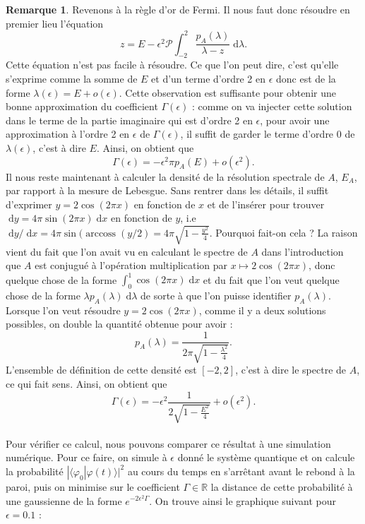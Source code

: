 \documentclass[12pt,openany,a4paper, titlepage]{article}
\newcommand{\f}[2]{\frac{#1}{#2}}
\newcommand{\dd}{\;\mathrm{d}}
\newcommand{\R}{\mathbb{R}}
\newcommand{\vp}{\varphi}
\theoremstyle{definition}
\theoremstyle{definition}
\theoremstyle{definition}
\theoremstyle{definition}
\theoremstyle{definition}
\newtheorem{rem}{Remarque}
\theoremstyle{definition}
\begin{document}
\begin{rem}
Revenons à la règle d'or de Fermi. Il nous faut donc résoudre en premier lieu l'équation
\begin{equation}
    z = E - \epsilon^2 \mathcal{P} \int_{-2}^2\f{p_A(\lambda)}{\lambda - z} \dd{\lambda}.
\end{equation}
Cette équation n'est pas facile à résoudre. Ce que l'on peut dire, c'est qu'elle s'exprime comme la somme de $E$ et d'un terme d'ordre 2 en $\epsilon$ donc est de la forme $\lambda(\epsilon) = E + o(\epsilon)$. Cette observation est suffisante pour obtenir une bonne approximation du coefficient $\Gamma(\epsilon)$ : comme on va injecter cette solution dans le terme de la partie imaginaire qui est d'ordre 2 en $\epsilon$, pour avoir une approximation à l'ordre 2 en $\epsilon$ de $\Gamma(\epsilon)$, il suffit de garder le terme d'ordre $0$ de $\lambda(\epsilon)$, c'est à dire $E$. Ainsi, on obtient que 
\begin{equation}
    \Gamma(\epsilon) = -\epsilon^2 \pi p_A(E) + o(\epsilon^2).
\end{equation}
Il nous reste maintenant à calculer la densité de la résolution spectrale de $A$, $E_A$, par rapport à la mesure de Lebesgue. Sans rentrer dans les détails, il suffit d'exprimer $y=2\cos(2\pi x)$ en fonction de $x$ et de l'insérer pour trouver $\dd y = 4\pi\sin(2\pi x) \dd x$ en fonction de $y$, i.e $\dd y / \dd x = 4\pi\sin(\operatorname{arccoss}( y/2)  = 4\pi \sqrt{1-\f{y^2}{4}}$.
Pourquoi fait-on cela ? La raison vient du fait que l'on avait vu en calculant le spectre de $A$ dans l'introduction que $A$ est conjugué à l'opération multiplication par $x\mapsto 2\cos(2\pi x)$, donc quelque chose de la forme $\int_{0}^{1} \cos(2\pi x) \dd x$ et du fait que l'on veut quelque chose de la forme $\lambda p_A(\lambda) \dd \lambda$ de sorte à que l'on puisse identifier $p_A(\lambda)$. Lorsque l'on veut résoudre $y=2\cos(2\pi x)$, comme il y a deux solutions possibles, on double la quantité obtenue pour avoir :
\begin{equation}
    p_A(\lambda) = \f{1}{2\pi \sqrt{1-\f{\lambda^2}{4}}}.
\end{equation}
L'ensemble de définition de cette densité est $[-2,2]$, c'est à dire le spectre de $A$, ce qui fait sens. Ainsi, on obtient que 
\begin{equation}
    \Gamma(\epsilon) = -\epsilon^2  \f{1}{2 \sqrt{1-\f{E^2}{4}}} + o(\epsilon^2).
\end{equation}\\

Pour vérifier ce calcul, nous pouvons comparer ce résultat à une simulation numérique. Pour ce faire, on simule à $\epsilon$ donné le système quantique et on calcule la probabilité $|\langle \vp_0 | \vp(t) \rangle |^2$ au cours du temps en s'arrêtant avant le rebond à la paroi, puis on minimise sur le coefficient $\Gamma\in\R$ la distance de cette probabilité à une gaussienne de la forme $e^{-2\epsilon^2\Gamma}$. On trouve ainsi le graphique suivant pour $\epsilon = 0.1$ :


\end{rem}
\end{document}

